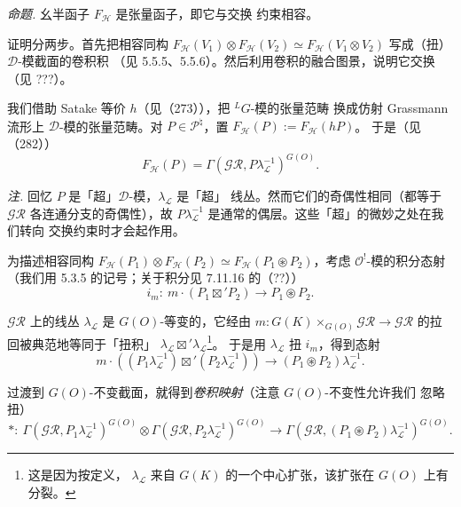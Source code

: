  \emph{命题.} 幺半函子 $F_{\mathcal{H}}$ 是张量函子，即它与交换
约束相容。

证明分两步。首先把相容同构
$F_{\mathcal{H}}(V_1)\otimes F_{\mathcal{H}}(V_2)\simeq
F_{\mathcal{H}}(V_1\otimes V_2)$ 写成（扭）$\mathcal{D}$-模截面的卷积积
（见 5.5.5、5.5.6）。然后利用卷积的融合图景，说明它交换（见 ???）。

 我们借助 Satake 等价 $h$（见（273）），把 ${}^{L}G$-模的张量范畴
换成仿射 Grassmann 流形上 $\mathcal{D}$-模的张量范畴。对
$P\in\mathcal{P}^{\natural}$，置 $F_{\mathcal{H}}(P):=F_{\mathcal{H}}(hP)$。
于是（见（282））
\begin{equation}\tag{288}
F_{\mathcal{H}}(P)=\Gamma(\mathcal{GR},P\lambda_{\mathcal{L}}^{-1})^{G(O)}.
\end{equation}

\emph{注.} 回忆 $P$ 是「超」$\mathcal{D}$-模，$\lambda_{\mathcal{L}}$ 是「超」
线丛。然而它们的奇偶性相同（都等于 $\mathcal{GR}$ 各连通分支的奇偶性），故
$P\lambda_{\mathcal{L}}^{-1}$ 是通常的偶层。这些「超」的微妙之处在我们转向
交换约束时才会起作用。

为描述相容同构
$F_{\mathcal{H}}(P_1)\otimes F_{\mathcal{H}}(P_2)\simeq
F_{\mathcal{H}}(P_1\circledast P_2)$，考虑 $\mathcal{O}^{!}$-模的积分态射
（我们用 5.3.5 的记号；关于积分见 7.11.16 的（??））
\begin{equation}\tag{289}
i_m:\ m\cdot(P_1\boxtimes'P_2)\to P_1\circledast P_2.
\end{equation}


$\mathcal{GR}$ 上的线丛 $\lambda_{\mathcal{L}}$ 是 $G(O)$-等变的，它经由
$m:G(K)\times_{G(O)}\mathcal{GR}\to\mathcal{GR}$ 的拉回被典范地等同于「扭积」
$\lambda_{\mathcal{L}}\boxtimes'\lambda_{\mathcal{L}}$\footnote{这是因为按定义，
$\lambda_{\mathcal{L}}$ 来自 $G(K)$ 的一个中心扩张，该扩张在 $G(O)$ 上有分裂。}。
于是用 $\lambda_{\mathcal{L}}$ 扭 $i_m$，得到态射
\[
m\cdot((P_1\lambda_{\mathcal{L}}^{-1})\boxtimes'(P_2\lambda_{\mathcal{L}}^{-1}))
\to(P_1\circledast P_2)\lambda_{\mathcal{L}}^{-1}.
\]

过渡到 $G(O)$-不变截面，就得到\emph{卷积映射}（注意 $G(O)$-不变性允许我们
忽略扭）
\begin{equation}\tag{290}
*:\ \Gamma(\mathcal{GR},P_1\lambda_{\mathcal{L}}^{-1})^{G(O)}\otimes
\Gamma(\mathcal{GR},P_2\lambda_{\mathcal{L}}^{-1})^{G(O)}\to
\Gamma(\mathcal{GR},(P_1\circledast P_2)\lambda_{\mathcal{L}}^{-1})^{G(O)}.
\end{equation}

